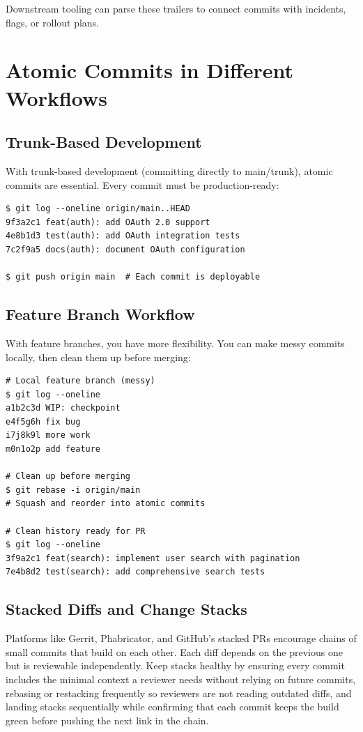 Downstream tooling can parse these trailers to connect commits with incidents, flags, or rollout plans.

\section{Atomic Commits in Different Workflows}

\subsection{Trunk-Based Development}
With trunk-based development (committing directly to main/trunk), atomic commits are essential. Every commit must be production-ready:

\begin{lstlisting}[style=shell,caption={Atomic commits on trunk}]
$ git log --oneline origin/main..HEAD
9f3a2c1 feat(auth): add OAuth 2.0 support
4e8b1d3 test(auth): add OAuth integration tests
7c2f9a5 docs(auth): document OAuth configuration

$ git push origin main  # Each commit is deployable
\end{lstlisting}

\subsection{Feature Branch Workflow}
With feature branches, you have more flexibility. You can make messy commits locally, then clean them up before merging:

\begin{lstlisting}[style=shell,caption={Messy local commits, cleaned before merge}]
# Local feature branch (messy)
$ git log --oneline
a1b2c3d WIP: checkpoint
e4f5g6h fix bug
i7j8k9l more work
m0n1o2p add feature

# Clean up before merging
$ git rebase -i origin/main
# Squash and reorder into atomic commits

# Clean history ready for PR
$ git log --oneline
3f9a2c1 feat(search): implement user search with pagination
7e4b8d2 test(search): add comprehensive search tests
\end{lstlisting}

\subsection{Stacked Diffs and Change Stacks}
Platforms like Gerrit, Phabricator, and GitHub's stacked PRs encourage chains of small commits that build on each other. Each diff depends on the previous one but is reviewable independently. Keep stacks healthy by ensuring every commit includes the minimal context a reviewer needs without relying on future commits, rebasing or restacking frequently so reviewers are not reading outdated diffs, and landing stacks sequentially while confirming that each commit keeps the build green before pushing the next link in the chain.

